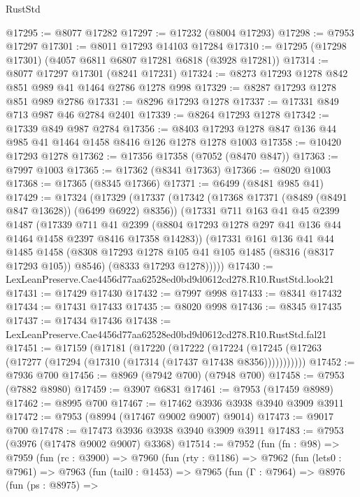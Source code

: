 \begin{lexlean}{RustStd}
\begin{coremodule}
@17295 := @8077 @17282
@17297 := @17232 (@8004 @17293)
@17298 := @7953 @17297
@17301 := @8011 @17293 @14103 @17284
@17310 := @17295 (@17298 @17301) (@4057 @6811 @6807 @17281 @6818 (@3928 @17281))
@17314 := @8077 @17297 @17301 (@8241 @17231)
@17324 := @8273 @17293 @1278 @842 @851 @989 @41 @1464 @2786 @1278 @998
@17329 := @8287 @17293 @1278 @851 @989 @2786
@17331 := @8296 @17293 @1278
@17337 := @17331 @849 @713 @987 @46 @2784 @2401
@17339 := @8264 @17293 @1278
@17342 := @17339 @849 @987 @2784
@17356 := @8403 @17293 @1278 @847 @136 @44 @985 @41 @1464 @1458 @8416 @126 @1278 @1278 @1003
@17358 := @10420 @17293 @1278
@17362 := @17356 @17358 (@7052 (@8470 @847))
@17363 := @7997 @1003
@17365 := @17362 (@8341 @17363)
@17366 := @8020 @1003
@17368 := @17365 (@8345 @17366)
@17371 := @6499 (@8481 @985 @41)
@17429 := @17324
    (@17329
      (@17337
        (@17342 (@17368 @17371 (@8489 (@8491 @847 @13628)) (@6499 @6922) @8356))
        (@17331
          @711
          @163
          @41
          @45
          @2399
          @1487
          (@17339
            @711
            @41
            @2399
            (@8804 @17293 @1278 @297 @41 @136 @44 @1464 @1458 @2397 @8416 @17358 @14283))
          (@17331
            @161
            @136
            @41
            @44
            @1485
            @1458
            (@8308 @17293 @1278 @105 @41 @105 @1485 (@8316 (@8317 @17293 @105)) @8546)
            (@8333 @17293 @1278)))))
@17430 := LexLeanPreserve.Cae4456d77aa62528ed0bd9d0612cd278.R10.RustStd.look21
@17431 := @17429 @17430
@17432 := @7997 @998
@17433 := @8341 @17432
@17434 := @17431 @17433
@17435 := @8020 @998
@17436 := @8345 @17435
@17437 := @17434 @17436
@17438 := LexLeanPreserve.Cae4456d77aa62528ed0bd9d0612cd278.R10.RustStd.fal21
@17451 := @17159
    (@17181
      (@17220
        (@17222
          (@17224 (@17245 (@17263 (@17277 (@17294 (@17310 (@17314 (@17437 @17438 @8356)))))))))))
@17452 := @7936 @700
@17456 := @8969 (@7942 @700) (@7948 @700)
@17458 := @7953 (@7882 @8980)
@17459 := @3907 @6831
@17461 := @7953 (@17459 @8989)
@17462 := @8995 @700
@17467 := @17462 @3936 @3938 @3940 @3909 @3911
@17472 := @7953 (@8994 (@17467 @9002 @9007) @9014)
@17473 := @9017 @700
@17478 := @17473 @3936 @3938 @3940 @3909 @3911
@17483 := @7953 (@3976 (@17478 @9002 @9007) @3368)
@17514 := @7952
    (fun (fn : @98) =>
    @7959
      (fun (rc : @3900) =>
      @7960
        (fun (rty : @1186) =>
        @7962
          (fun (lets0 : @7961) =>
          @7963
            (fun (tail0 : @1453) =>
            @7965
              (fun (Γ : @7964) =>
              @8976
                (fun (ps : @8975) =>

\end{coremodule}
\end{lexlean}
